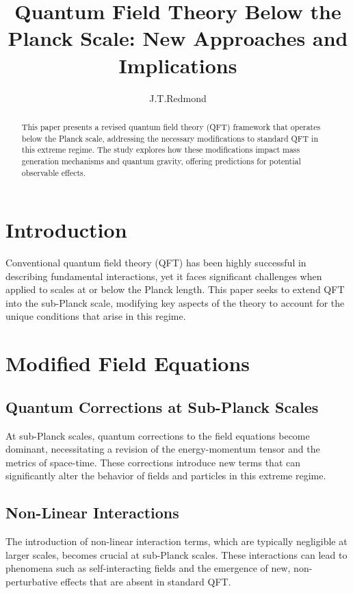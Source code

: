 \documentclass{article}
\title{Quantum Field Theory Below the Planck Scale: New Approaches and Implications}
\author{J.T.Redmond}
\begin{document}
\maketitle

\begin{abstract}
This paper presents a revised quantum field theory (QFT) framework that operates below the Planck scale, addressing the necessary modifications to standard QFT in this extreme regime. The study explores how these modifications impact mass generation mechanisms and quantum gravity, offering predictions for potential observable effects.
\end{abstract}

\section{Introduction}
Conventional quantum field theory (QFT) has been highly successful in describing fundamental interactions, yet it faces significant challenges when applied to scales at or below the Planck length. This paper seeks to extend QFT into the sub-Planck scale, modifying key aspects of the theory to account for the unique conditions that arise in this regime.

\section{Modified Field Equations}

\subsection{Quantum Corrections at Sub-Planck Scales}
At sub-Planck scales, quantum corrections to the field equations become dominant, necessitating a revision of the energy-momentum tensor and the metrics of space-time. These corrections introduce new terms that can significantly alter the behavior of fields and particles in this extreme regime.

\subsection{Non-Linear Interactions}
The introduction of non-linear interaction terms, which are typically negligible at larger scales, becomes crucial at sub-Planck scales. These interactions can lead to phenomena such as self-interacting fields and the emergence of new, non-perturbative effects that are absent in standard QFT.
\end{document}
